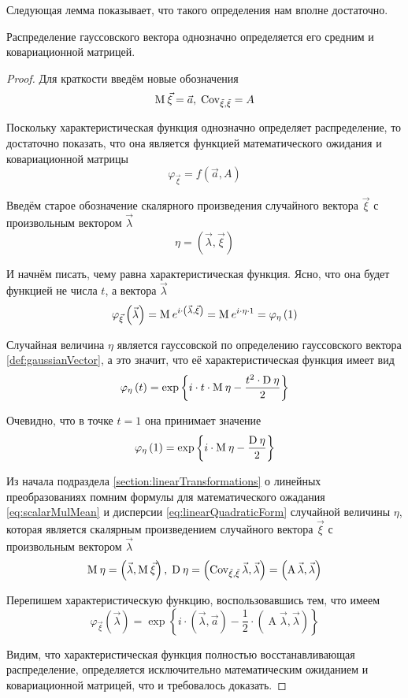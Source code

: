 Следующая лемма показывает, что такого определения нам вполне достаточно.

\begin{lemma}
    Распределение гауссовского вектора однозначно определяется его средним и
    ковариационной матрицей.
\end{lemma}
\begin{proof}
    Для краткости введём новые обозначения
    $$\operatorname{M}_{} \vec{\xi} = \vec{a},\; \operatorname{Cov_{\vec{\xi}, \vec{\xi}}} = A$$

    Поскольку характеристическая функция однозначно определяет распределение,
    то достаточно показать, что она является функцией математического ожидания
    и ковариационной матрицы
    $$\varphi_{\vec{\xi}} = f\left( \vec{a}, A \right)$$

    Введём старое обозначение скалярного произведения случайного вектора
    $\vec{\xi}$ с произвольным вектором $\vec{\lambda}$
    $$\eta = \left( \vec{\lambda}, \vec{\xi} \right)$$

    И начнём писать, чему равна характеристическая функция. Ясно, что она будет
    функцией не числа $t$, а вектора $\vec{\lambda}$
    $$\varphi_{\vec{\xi}}\left( \vec{\lambda} \right)
        = \operatorname{M}_{} e^{i \cdot \left( \vec{\lambda}, \vec{\xi} \right)}
        = \operatorname{M}_{} e^{i \cdot \eta \cdot 1}
        = \varphi_{\eta}\left( 1 \right)$$

    Случайная величина $\eta$ является гауссовской по определению гауссовского
    вектора \ref{def:gaussianVector}, а это значит, что её характеристическая
    функция имеет вид
    $$\varphi_{\eta}\left( t \right)
        = \exp{\left\{ i \cdot t \cdot \operatorname{M}_{} \eta
            - \frac{t^2 \cdot \operatorname{D}_{} \eta}{2} \right\}}$$

    Очевидно, что в точке $t=1$ она принимает значение
    $$\varphi_{\eta}\left( 1 \right)
        = \exp{\left\{ i \cdot \operatorname{M}_{} \eta
            - \frac{\operatorname{D}_{} \eta}{2} \right\}}$$

    Из начала подраздела \ref{section:linearTransformations} о линейных
    преобразованиях помним формулы для математического ожадания
    \eqref{eq:scalarMulMean} и дисперсии \eqref{eq:linearQuadraticForm}
    случайной величины $\eta$, которая является скалярным произведением
    случайного вектора $\vec{\xi}$ с произвольным вектором $\vec{\lambda}$
    $$\operatorname{M}_{} \eta = \left( \vec{\lambda}, \operatorname{M}_{} \vec{\xi} \right),\;
        \operatorname{D}_{} \eta
            = \left( \operatorname{\operatorname{Cov_{\vec{\xi}, \vec{\xi}}}} \vec{\lambda} ,
                \vec{\lambda} \right)
            = \left( \operatorname{A} \vec{\lambda} ,
                \vec{\lambda} \right)$$

    Перепишем характеристическую функцию, воспользовавшись тем, что имеем
    $$\varphi_{\vec{\xi}}\left( \vec{\lambda} \right)
        = \exp{\left\{ i \cdot \left( \vec{\lambda}, \vec{a} \right)
            - \frac{1}{2} \cdot \left( \operatorname{A} \vec{\lambda} ,
                \vec{\lambda} \right) \right\}}$$

    Видим, что характеристическая функция полностью восстанавливающая
    распределение, определяется исключительно математическим ожиданием
    и ковариационной матрицей, что и требовалось доказать.
\end{proof}

